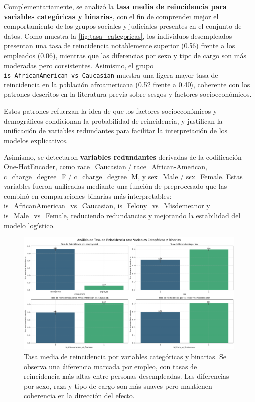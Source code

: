 Complementariamente, se analizó la \textbf{tasa media de reincidencia para variables categóricas y binarias}, con el fin de comprender mejor el comportamiento de los grupos sociales y judiciales presentes en el conjunto de datos.  
Como muestra la \autoref{fig:tasa_categoricas}, los individuos desempleados presentan una tasa de reincidencia notablemente superior (0.56) frente a los empleados (0.06), mientras que las diferencias por sexo y tipo de cargo son más moderadas pero consistentes.  
Asimismo, el grupo \texttt{is\_AfricanAmerican\_vs\_Caucasian} muestra una ligera mayor tasa de reincidencia en la población afroamericana (0.52 frente a 0.40), coherente con los patrones descritos en la literatura previa sobre sesgos y factores socioeconómicos.


Estos patrones refuerzan la idea de que los factores socioeconómicos y demográficos condicionan la probabilidad de reincidencia, y justifican la unificación de variables redundantes para facilitar la interpretación de los modelos explicativos.

Asimismo, se detectaron \textbf{variables redundantes} derivadas de la codificación One-HotEncoder, como
race\_Caucasian / race\_African-American,
c\_charge\_degree\_F / c\_charge\_degree\_M, y
sex\_Male / sex\_Female. 
Estas variables fueron unificadas mediante una función de preprocesado que las combinó en comparaciones binarias más interpretables: is\_AfricanAmerican\_vs\_Caucasian,
is\_Felony\_vs\_Misdemeanor y
is\_Male\_vs\_Female, reduciendo redundancias y mejorando la estabilidad del modelo logístico.

\begin{figure}[h]
  \centering
  \includegraphics[width=\linewidth]{figures/tasa_categoricas.png}
  \caption{Tasa media de reincidencia por variables categóricas y binarias. 
  Se observa una diferencia marcada por empleo, con tasas de reincidencia más altas entre personas desempleadas. 
  Las diferencias por sexo, raza y tipo de cargo son más suaves pero mantienen coherencia en la dirección del efecto.}
  \label{fig:tasa_categoricas}
\end{figure}


